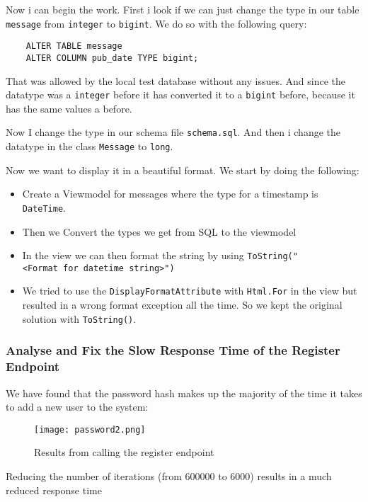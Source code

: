 Now i can begin the work. First i look if we can just change the type in our table \texttt{message} from \texttt{integer} to \texttt{bigint}. We do so with the following query:

\begin{verbatim}
    ALTER TABLE message
	ALTER COLUMN pub_date TYPE bigint;
\end{verbatim}

That was allowed by the local test database without any issues. And since the datatype was a \texttt{integer} before it has converted it to a \texttt{bigint} before, because it has the same values a before.

Now I change the type in our schema file \texttt{schema.sql}. And then i change the datatype in the class \texttt{Message} to
\texttt{long}.

Now we want to display it in a beautiful format. We start by doing the following:

\begin{itemize}
    \item Create a Viewmodel for messages where the type for a timestamp is \texttt{DateTime}.
    \item Then we Convert the types we get from SQL to the viewmodel
    \item In the view we can then format the string by using \texttt{ToString("\textless{}Format\ for\ datetime\ string\textgreater{}")}
    \item We tried to use the \texttt{DisplayFormatAttribute} with \texttt{Html.For} in the view but resulted in a wrong format exception all the time. So we kept the original solution with \texttt{ToString()}.
\end{itemize}

\subsubsection{Analyse and Fix the Slow Response Time of the Register Endpoint}
\label{log:analyse-and-fix-the-slow-response-time-of-the-register-endpoint}

We have found that the password hash makes up the majority of the time it takes to add a new user to the system:

\begin{figure}[H]
\centering
\texttt{[image: password2.png]}
\caption{Results from calling the register endpoint}
\end{figure}

Reducing the number of iterations (from 600000 to 6000) results in a much reduced response time

